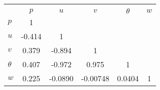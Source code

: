 \begin{tabular}{l*{5}{c}}
\toprule
                &\multicolumn{5}{c}{}                             \\
                &    $ p $&    $ u $&    $ v $&$ \theta $&    $ w $\\
\midrule
$ p $           &        1&         &         &         &         \\
$ u $           &   -0.414&        1&         &         &         \\
$ v $           &    0.379&   -0.894&        1&         &         \\
$ \theta $      &    0.407&   -0.972&    0.975&        1&         \\
$ w $           &    0.225&  -0.0890& -0.00748&   0.0404&        1\\
\bottomrule
\end{tabular}
